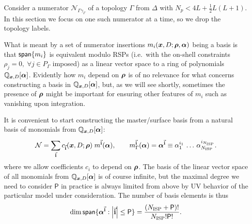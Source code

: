 Consider a numerator $\mathcal{N}_{\Gamma\gamma_\Gamma}$ of a topology $\Gamma$ from $\Delta$ with $N_p <  4L + \frac{1}{2}L(L+1)$.
In this section we focus on one such numerator at a time, so we drop the topology labels.

What is meant by a set of numerator insertions $m_{i}(\vb*{x},D;\vb*{\rho},\vb*{\alpha})$ being a basis is that
$\mathsf{span}\{m_{i}\}$ is equivalent
modulo RSPs (i.e.\ with the on-shell constraints $\rho_j = 0,\;\forall j\in P_\Gamma$ imposed)
as a linear vector space to a ring of polynomials $\mathbb{Q}_{\vb*{x},D}[\vb*{\alpha}]$.
Evidently how $m_{i}$ depend on $\vb*{\rho}$ is of no relevance for what concerns constructing
a basis in $\mathbb{Q}_{\vb*{x},D}[\vb*{\alpha}]$, but, as we will see shortly, sometimes the presence
of $\vb*{\rho}$ might be important for ensuring other features of $m_{i}$ such as vanishing
upon integration.


It is convenient to start constructing the master/surface basis from a natural basis of monomials from $\mathbb{Q}_{\vb*{x},D}[\vb*{\alpha}]$:
\begin{equation}
  \mathcal{N} = \sum_{\va{i}}^{} c_{\va{i}}(\vb*{x},D;\vb*{\rho}) \; m^{\va{i}}(\vb*{\alpha}), \qquad
  m_\Gamma^{\va{i}}(\vb*{\alpha}) = \vb*{\alpha}^{\va{i}} \equiv 
  \alpha_1^{i_1}\,\ldots{}\,\alpha_{N_\text{ISP} }^{i_{N_\text{ISP} }}.
\end{equation}
where we allow coefficients $c_{i}$ to depend on $\vb*{\rho}$.
The basis of the linear vector space of all monomials from $\mathbb{Q}_{\vb*{x},D}[\vb*{\alpha}]$ is of course infinite,
but the maximal degree  we need to consider $\mathsf{P}$ in practice is always limited from above by UV behavior of the particular model under consideration.
The number of basis elements is thus 
\begin{equation} \label{eq:number_of_monomials}
  \dim{\mathsf{span}\{\vb*{\alpha}^{\va{i}} : \abs{\va{i}} \leq  \mathsf{P}\}} =  \frac{(N_\text{ISP} + \mathsf{P})!}{N_\text{ISP}! \mathsf{P}!}.
\end{equation}

